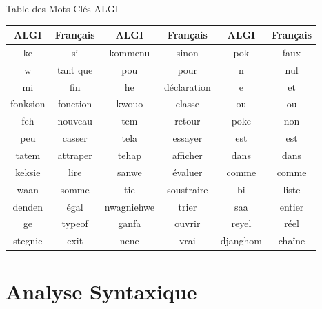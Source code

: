 \documentclass[10pt]{beamer}
\begin{document}
\begin{frame}{Table des Mots-Clés ALGI}
    \begin{table}
        \begin{tabular}{|c|c|c|c|c|c|}
            \hline
            \textbf{ALGI} & \textbf{Français} & \textbf{ALGI} & \textbf{Français} & \textbf{ALGI} & \textbf{Français}\\
            \hline
            ke & si & kommenu & sinon & pok & faux \\
            w & tant que & pou & pour & n & nul \\
            mi & fin & he & déclaration & e & et \\
            fonksion & fonction & kwouo & classe & ou & ou \\
            feh & nouveau & tem & retour & poke & non \\
            peu & casser & tela & essayer & est & est \\
            tatem & attraper & tehap & afficher & dans & dans \\
            keksie & lire & sanwe & évaluer & comme & comme\\
            waan & somme & tie & soustraire & bi & liste \\
            denden & égal & nwagniehwe & trier & saa & entier \\
            ge & typeof & ganfa & ouvrir & reyel & réel \\
            stegnie & exit & nene & vrai & djanghom & chaîne \\   
            \hline
        \end{tabular}
    \end{table}
\end{frame}

\section{Analyse Syntaxique}
\end{document}
